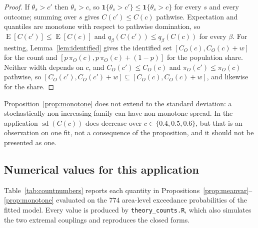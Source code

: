 \begin{proof}
If $\theta_s > c'$ then $\theta_s > c$, so
$\mathbf{1}\{\theta_s>c'\} \le \mathbf{1}\{\theta_s>c\}$ for every $s$ and every
outcome; summing over $s$ gives $C(c') \le C(c)$ pathwise.  Expectation and
quantiles are monotone with respect to pathwise domination, so
$\operatorname{E}[C(c')] \le \operatorname{E}[C(c)]$ and
$q_\beta(C(c')) \le q_\beta(C(c))$ for every $\beta$.  For nesting,
Lemma~\ref{lem:identified} gives the identified set $[C_O(c), C_O(c)+w]$
for the count and $[p\,\pi_O(c), p\,\pi_O(c)+(1-p)]$ for the population
share.  Neither width depends on $c$, and $C_O(c') \le C_O(c)$ and
$\pi_O(c') \le \pi_O(c)$ pathwise, so
$[C_O(c'), C_O(c')+w] \subseteq [C_O(c), C_O(c)+w]$, and likewise for the
share.
\end{proof}

\begin{remark}
\label{rem:sdnot}
Proposition~\ref{prop:monotone} does not extend to the standard deviation:
a stochastically non-increasing family can have non-monotone spread.  In the
application $\operatorname{sd}(C(c))$ does decrease over
$c \in \{0.4,0.5,0.6\}$, but that is an observation on one fit, not a
consequence of the proposition, and it should not be presented as one.
\end{remark}

\subsection*{Numerical values for this application}

Table~\ref{tab:countnumbers} reports each quantity in
Propositions~\ref{prop:meanvar}--\ref{prop:monotone} evaluated on the $774$
area-level exceedance probabilities of the fitted model.  Every value is
produced by \texttt{theory\_counts.R}, which also simulates the two
extremal couplings and reproduces the closed forms.

